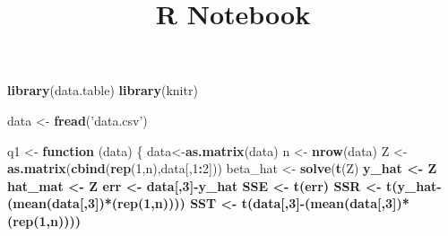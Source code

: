 \documentclass[]{article}
\title{R Notebook}
\author{}
\date{}
\newenvironment{Shaded}{\begin{snugshade}}{\end{snugshade}}
\newcommand{\KeywordTok}[1]{\textcolor[rgb]{0.13,0.29,0.53}{\textbf{#1}}}
\newcommand{\DecValTok}[1]{\textcolor[rgb]{0.00,0.00,0.81}{#1}}
\newcommand{\StringTok}[1]{\textcolor[rgb]{0.31,0.60,0.02}{#1}}
\newcommand{\ControlFlowTok}[1]{\textcolor[rgb]{0.13,0.29,0.53}{\textbf{#1}}}
\newcommand{\OperatorTok}[1]{\textcolor[rgb]{0.81,0.36,0.00}{\textbf{#1}}}
\newcommand{\NormalTok}[1]{#1}
\begin{document}
\maketitle

\begin{Shaded}
\begin{Highlighting}[]
\KeywordTok{library}\NormalTok{(data.table)}
\KeywordTok{library}\NormalTok{(knitr)}
\end{Highlighting}
\end{Shaded}

\begin{Shaded}
\begin{Highlighting}[]
\NormalTok{data <-}\StringTok{ }\KeywordTok{fread}\NormalTok{(}\StringTok{'data.csv'}\NormalTok{)}

\NormalTok{q1 <-}\StringTok{ }\ControlFlowTok{function}\NormalTok{ (data) }
\NormalTok{\{}
\NormalTok{  data<-}\KeywordTok{as.matrix}\NormalTok{(data)}
\NormalTok{  n <-}\StringTok{ }\KeywordTok{nrow}\NormalTok{(data)}
\NormalTok{  Z <-}\StringTok{ }\KeywordTok{as.matrix}\NormalTok{(}\KeywordTok{cbind}\NormalTok{(}\KeywordTok{rep}\NormalTok{(}\DecValTok{1}\NormalTok{,n),data[,}\DecValTok{1}\OperatorTok{:}\DecValTok{2}\NormalTok{]))}
\NormalTok{  beta_hat <-}\StringTok{ }\KeywordTok{solve}\NormalTok{(}\KeywordTok{t}\NormalTok{(Z)}\OperatorTok{%*%}\NormalTok{Z)}\OperatorTok{%*%}\KeywordTok{t}\NormalTok{(Z)}\OperatorTok{%*%}\NormalTok{data[,}\DecValTok{3}\NormalTok{]}
\NormalTok{  y_hat <-}\StringTok{ }\NormalTok{Z}\OperatorTok{%*%}\NormalTok{beta_hat}
\NormalTok{  hat_mat <-}\StringTok{ }\NormalTok{Z}\OperatorTok{%*%}\KeywordTok{solve}\NormalTok{(}\KeywordTok{t}\NormalTok{(Z)}\OperatorTok{%*%}\NormalTok{Z)}\OperatorTok{%*%}\KeywordTok{t}\NormalTok{(Z)}
\NormalTok{  err <-}\StringTok{ }\NormalTok{data[,}\DecValTok{3}\NormalTok{]}\OperatorTok{-}\NormalTok{y_hat}
\NormalTok{  SSE <-}\StringTok{ }\KeywordTok{t}\NormalTok{(err)}\OperatorTok{%*%}\NormalTok{err}
\NormalTok{  SSR <-}\StringTok{ }\KeywordTok{t}\NormalTok{(y_hat}\OperatorTok{-}\NormalTok{(}\KeywordTok{mean}\NormalTok{(data[,}\DecValTok{3}\NormalTok{])}\OperatorTok{*}\NormalTok{(}\KeywordTok{rep}\NormalTok{(}\DecValTok{1}\NormalTok{,n))))}\OperatorTok{%*%}\NormalTok{(y_hat}\OperatorTok{-}\NormalTok{(}\KeywordTok{mean}\NormalTok{(data[,}\DecValTok{3}\NormalTok{])}\OperatorTok{*}\NormalTok{(}\KeywordTok{rep}\NormalTok{(}\DecValTok{1}\NormalTok{,n))))}
\NormalTok{  SST <-}\StringTok{ }\KeywordTok{t}\NormalTok{(data[,}\DecValTok{3}\NormalTok{]}\OperatorTok{-}\NormalTok{(}\KeywordTok{mean}\NormalTok{(data[,}\DecValTok{3}\NormalTok{])}\OperatorTok{*}\NormalTok{(}\KeywordTok{rep}\NormalTok{(}\DecValTok{1}\NormalTok{,n))))}\OperatorTok{%*%}\NormalTok{(data[,}\DecValTok{3}\NormalTok{]}\OperatorTok{-}\NormalTok{(}\KeywordTok{mean}\NormalTok{(data[,}\DecValTok{3}\NormalTok{])}\OperatorTok{*}\NormalTok{(}\KeywordTok{rep}\NormalTok{(}\DecValTok{1}\NormalTok{,n))))}
}}}}}}
\end{Highlighting}
\end{Shaded}
\end{document}
